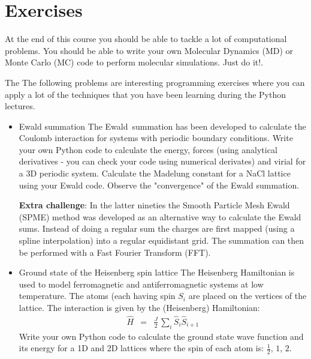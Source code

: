 \documentclass[11pt]{article}
\begin{document}
\thispagestyle{empty}
\renewcommand{\labelitemii}{$\star$}
\pagebreak
\pagestyle{plain}
\setcounter{page}{1}
\section*{Exercises}
At the end of this course you should be able to tackle a lot of computational problems.
You should be able to write your own Molecular Dynamics (MD) or Monte Carlo (MC) code 
to perform molecular simulations. Just do it!.

The
The following problems are interesting programming exercises where you can apply a lot of 
the techniques that you have been learning during the Python lectures.

\begin{itemize}
\item Ewald summation \newline
The Ewald\,\cite{EWALD:1921a,DELEEUW:1980a,DELEEUW:1980b,DELEEUW:1983a} summation 
has been developed to calculate the Coulomb interaction for systems with periodic boundary conditions. 
Write your own Python code to calculate the energy, forces 
(using analytical derivatives - you can check your code using numerical derivates) and 
virial for a 3D periodic system. Calculate the Madelung constant for a NaCl lattice using your Ewald code. 
Observe the "convergence" of the Ewald summation.  

\textbf{Extra challenge}:\newline
In the latter nineties the Smooth Particle Mesh Ewald\,\cite{ESSMANN:1995a} (SPME) 
method was developed as an alternative way to calculate the Ewald sums. 
Instead of doing a regular sum the charges are first mapped (using a spline interpolation) 
into a regular equidistant grid. The summation can then be performed with a Fast Fourier 
Transform (FFT).

\item Ground state of the Heisenberg spin lattice\newline
The Heisenberg Hamiltonian is used to model ferromagnetic and antiferromagnetic systems at low temperature.
The atoms (each having spin $S_i$ are placed on the vertices of the lattice. 
The interaction is given by the (Heisenberg) Hamiltonian:
\begin{eqnarray}
       \hat{H} & = & \frac{J}{2} \, \sum_{i} \hat{S}_{i}  \hat{S}_{i+1}
\end{eqnarray}
Write your own Python code to calculate the ground state wave function and its energy for a 1D and 2D lattices
where the spin of each atom is: $\frac{1}{2}$, $1$, $2$. 


\end{itemize}
\end{document}
